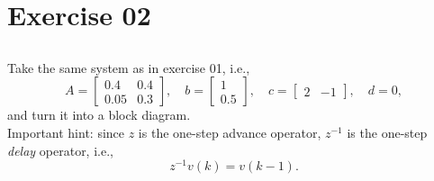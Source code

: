 \section{Exercise 02}
\subsection{}

\begin{frame}
\myPause
 Take the same system as in exercise 01, i.e.,
 \begin{displaymath}
  A = \begin{bmatrix} 0.4 & 0.4 \\ 0.05 & 0.3 \end{bmatrix}, \quad
  b = \begin{bmatrix} 1 \\ 0.5 \end{bmatrix}, \quad
  c = \begin{bmatrix} 2 & -1 \end{bmatrix}, \quad
  d = 0,
 \end{displaymath}
 and turn it into a block diagram.\\ \myPause
 \vspace{5mm}Important hint: since $z$ is the one-step advance operator, $z^{-1}$ is the one-step\\
 \emph{delay} operator, i.e., 
 \begin{displaymath}
  z^{-1} v(k) = v(k-1).
 \end{displaymath}
\end{frame}

